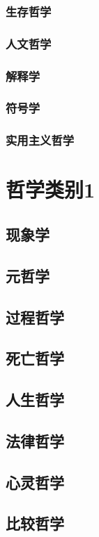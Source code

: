 \documentclass[UTF8]{../RepresentationUniverse}
\begin{document}
    \subsection{生存哲学}
    \subsection{人文哲学}
    \subsection{解释学}
    \subsection{符号学}
    \subsection{实用主义哲学}
    

    \chapter{哲学类别1}

    \section{现象学}
    \section{元哲学}
    \section{过程哲学}
    \section{死亡哲学}
    \section{人生哲学}
    \section{法律哲学}
    \section{心灵哲学}
    \section{比较哲学}
\end{document}
